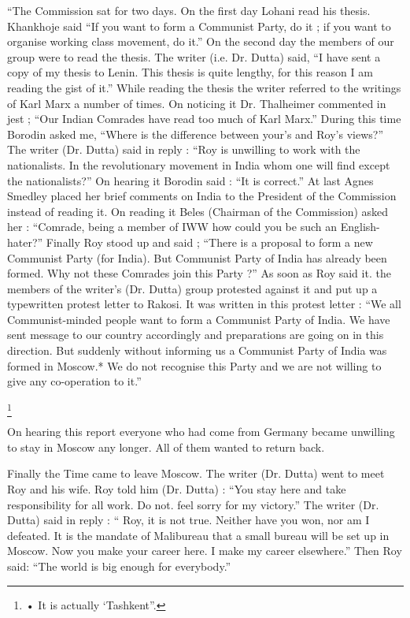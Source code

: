 “The Commission sat for two days. On the first day Lohani read his thesis. Khankhoje said “If you want to form a Communist Party, do it ; if you want to organise working class movement, do it.” On the second day the members of our group were to read the thesis. The writer (i.e. Dr. Dutta) said, “I have sent a copy of my thesis to Lenin. This thesis is quite lengthy, for this reason I am reading the gist of it.” While 
reading the thesis the writer referred to the writings of Karl Marx a number of times. On noticing it Dr. Thalheimer commented in jest ; “Our Indian Comrades have read too much of Karl Marx.” During this time Borodin asked me, “Where is the difference between your’s and Roy’s views?” The writer (Dr. Dutta) said in reply : “Roy is unwilling to work with the nationalists. In the revolutionary movement in India whom one will find except the nationalists?” On hearing it Borodin said : “It is correct.” At last Agnes Smedley placed her brief comments on India to the President of the Commission instead of reading it. On reading it Beles (Chairman of the Commission) asked her : “Comrade, being a member of IWW how could you be such an English-hater?” Finally Roy stood up and said ; “There is a proposal to form a new Communist Party (for India). But Communist Party of India has already been formed. Why not these Comrades join this Party ?” As soon as Roy said it. the members of the writer’s (Dr. Dutta) group protested against it and put up a typewritten protest letter to Rakosi. It was written in this protest letter : “We all Communist-minded people want to form a Communist Party of India. We have sent message to our country accordingly and preparations are going on in this direction. But suddenly without informing us a Communist Party of India was formed in Moscow.* We do not recognise this Party and we are not willing to give any co-operation to it.” 


\footnote{• It is actually ‘Tashkent”.}

On hearing this report everyone who had come from Germany became unwilling to stay in Moscow any longer. All of them wanted to return back. 

Finally the Time came to leave Moscow. The writer (Dr. Dutta) went to meet Roy and his wife. Roy told him (Dr. Dutta) : “You stay here and take responsibility for all work. Do not. feel sorry for my victory.” The writer (Dr. Dutta) said in reply : “ Roy, it is not true. Neither have you won, nor am I defeated. It is the mandate of Malibureau that a small bureau will be set up in Moscow. Now you make your career here. I make my career elsewhere.” Then Roy said: “The world is big enough for everybody.” 
